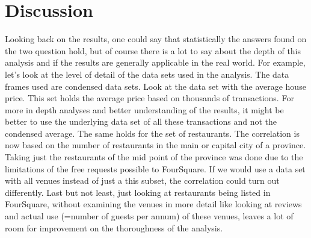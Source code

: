 \section{Discussion}
Looking back on the results, one could say that statistically the answers found on the two question hold, but of course there is a lot to say about the depth of this analysis and if the results are generally applicable in the real world. For example, let's look at the level of detail of the data sets used in the analysis. The data frames used are condensed data sets. Look at the data set with the average house price. This set holds the average price based on thousands of transactions. For more in depth analyses and better understanding of the results, it might be better to use the underlying data set of all these transactions and not the condensed average. The same holds for the set of restaurants. The correlation is now based on the number of restaurants in the main or capital city of a province. Taking just the restaurants of the mid point of the province was done due to the limitations of the free requests possible to FourSquare. If we would use a data set with all venues instead of just a this subset, the correlation could turn out differently. Last but not least, just looking at restaurants being listed in FourSquare, without examining the venues in more detail like looking at reviews and actual use (=number of guests per annum) of these venues, leaves a lot of room for improvement on the thoroughness of the analysis.